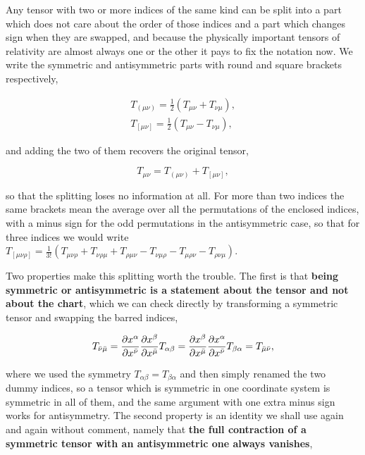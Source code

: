         Any tensor with two or more indices of the same kind can be split into a part which does not care about the order of those indices and a part which changes sign when they are swapped, and because the physically important tensors of relativity are almost always one or the other it pays to fix the notation now. We write the symmetric and antisymmetric parts with round and square brackets respectively,

        \begin{align}
            T_{(\mu\nu)} = \frac{1}{2}\left(T_{\mu\nu} + T_{\nu\mu}\right),\\
            T_{[\mu\nu]} = \frac{1}{2}\left(T_{\mu\nu} - T_{\nu\mu}\right),
        \end{align}

        and adding the two of them recovers the original tensor,

        \begin{equation}
            T_{\mu\nu} = T_{(\mu\nu)} + T_{[\mu\nu]},
        \end{equation}

        so that the splitting loses no information at all. For more than two indices the same brackets mean the average over all the permutations of the enclosed indices, with a minus sign for the odd permutations in the antisymmetric case, so that for three indices we would write $T_{[\mu\nu\rho]} = \frac{1}{3!}\left(T_{\mu\nu\rho} + T_{\nu\rho\mu} + T_{\rho\mu\nu} - T_{\nu\mu\rho} - T_{\mu\rho\nu} - T_{\rho\nu\mu}\right)$.

        Two properties make this splitting worth the trouble. The first is that \textbf{being symmetric or antisymmetric is a statement about the tensor and not about the chart}, which we can check directly by transforming a symmetric tensor and swapping the barred indices,

        \begin{align*}
            T_{\Bar{\nu}\Bar{\mu}} = \frac{\partial x^{\alpha}}{\partial x^{\Bar{\nu}}}\frac{\partial x^{\beta}}{\partial x^{\Bar{\mu}}}T_{\alpha\beta} = \frac{\partial x^{\beta}}{\partial x^{\Bar{\mu}}}\frac{\partial x^{\alpha}}{\partial x^{\Bar{\nu}}}T_{\beta\alpha} = T_{\Bar{\mu}\Bar{\nu}},
        \end{align*}

        where we used the symmetry $T_{\alpha\beta} = T_{\beta\alpha}$ and then simply renamed the two dummy indices, so a tensor which is symmetric in one coordinate system is symmetric in all of them, and the same argument with one extra minus sign works for antisymmetry. The second property is an identity we shall use again and again without comment, namely that \textbf{the full contraction of a symmetric tensor with an antisymmetric one always vanishes},

